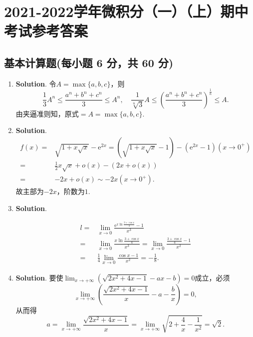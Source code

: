 \documentclass[../main.tex]{subfiles}
\begin{document}
\chapter{2021-2022学年微积分（一）（上）期中考试参考答案}
\section{基本计算题(每小题 6 分，共 60 分)}
\begin{enumerate}
    \item \textbf{Solution}. 令$A=\max\{a,b,c\}$，则
          \[
              \frac{1}{3}A^{n}\leq\frac{a^{n}+b^{n}+c^{n}}{3}\leq A^{n},\quad \frac{1}{\sqrt[n]{3}}
              A\leq\left(\frac{a^{n}+b^{n}+c^{n}}{3}\right)^{\frac{1}{n}}\leq A.
          \]
          由夹逼准则知，原式$=A=\max\{a,b,c\}$.

    \item \textbf{Solution}.
          \[
              \begin{aligned}
                  f(x)= {} & \sqrt{1+x\sqrt{x}}-\mathrm{e}^{2x}=\left(\sqrt{1+x\sqrt{x}}-1\right)-\left(\mathrm{e}^{2x}-1\right)(x\to 0^{+}) \\
                  = {}     & \frac{1}{2}x\sqrt{x}+o(x)-(2x+o(x))                                                                             \\
                  = {}     & -2x+o(x)\sim -2x(x\to0^{+}).
              \end{aligned}
          \]
          故主部为$-2x$，阶数为$1$.

    \item \textbf{Solution}.

          \[
              \begin{aligned}
                  l= {} & \lim_{x\to0}\frac{\mathrm{e}^{x\ln\frac{3+\cos x}{4}}-1}{x^3}                               \\
                  = {}  & \lim_{x\to0}\frac{x\ln\frac{3+\cos x}{4}}{x^3}=\lim_{x\to0}\frac{\frac{3+\cos x}{4}-1}{x^2} \\
                  = {}  & \frac{1}{4}\lim_{x\to0}\frac{\cos x-1}{x^2}=-\frac{1}{8}.
              \end{aligned}
          \]

    \item \textbf{Solution}. 要使$\lim_{x\to+\infty}\left(\sqrt{2x^{2}+4x-1}-ax-b
              \right)=0$成立，必须
          \[
              \lim_{x\to+\infty}\left(\frac{\sqrt{2x^{2}+4x-1}}{x}-a-\frac{b}{x}\right)
              =0,
          \]
          从而得
          \[
              a=\lim_{x\to+\infty}\frac{\sqrt{2x^{2}+4x-1}}{x}=\lim_{x\to+\infty}\sqrt{2+\frac{4}{x}-\frac{1}{x^{2}}}
              =\sqrt{2}.
          \]


\end{enumerate}
\end{document}
